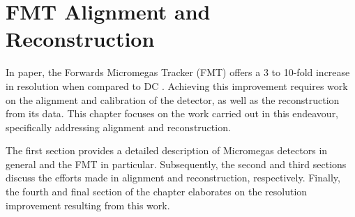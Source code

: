 \section{FMT Alignment and Reconstruction}
\label{sec::fmt_alignment_and_reconstruction}
    In paper, the Forwards Micromegas Tracker (FMT) offers a 3 to 10-fold increase in resolution when compared to DC \cite{aune2009}.
    Achieving this improvement requires work on the alignment and calibration of the detector, as well as the reconstruction from its data.
    This chapter focuses on the work carried out in this endeavour, specifically addressing alignment and reconstruction.

    The first section provides a detailed description of Micromegas detectors in general and the FMT in particular.
    Subsequently, the second and third sections discuss the efforts made in alignment and reconstruction, respectively.
    Finally, the fourth and final section of the chapter elaborates on the resolution improvement resulting from this work.

    
    
    
    
